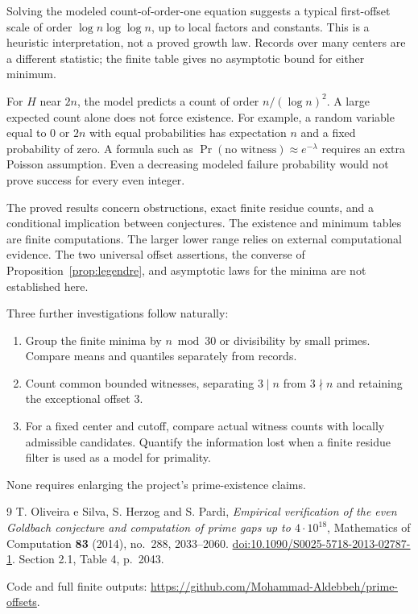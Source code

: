 \documentclass[11pt,a4paper]{article}
\begin{document}
Solving the modeled count-of-order-one equation suggests a typical
first-offset scale of order $\log n\log\log n$, up to local factors and
constants. This is a heuristic interpretation, not a proved growth law.
Records over many centers are a different statistic; the finite table gives
no asymptotic bound for either minimum.

For $H$ near $2n$, the model predicts a count of order $n/(\log n)^2$.
A large expected count alone does not force existence. For example,
a random variable equal to 0 or $2n$ with equal probabilities has
expectation $n$ and a fixed probability of zero. A formula such as
$\Pr(\text{no witness})\approx e^{-\lambda}$ requires an extra Poisson
assumption. Even a decreasing modeled failure probability would not
prove success for every even integer.

The proved results concern obstructions, exact finite residue counts, and
a conditional implication between conjectures. The existence and minimum
tables are finite computations. The larger lower range relies on external
computational evidence. The two universal offset assertions, the converse
of Proposition~\ref{prop:legendre}, and asymptotic laws for the minima are
not established here.

Three further investigations follow naturally:
\begin{enumerate}
\item Group the finite minima by $n\bmod30$ or divisibility by small primes.
Compare means and quantiles separately from records.
\item Count common bounded witnesses, separating $3\mid n$ from
$3\nmid n$ and retaining the exceptional offset 3.
\item For a fixed center and cutoff, compare actual witness counts with
locally admissible candidates. Quantify the information lost when a finite
residue filter is used as a model for primality.
\end{enumerate}
None requires enlarging the project's prime-existence claims.

\begin{thebibliography}{9}
T. Oliveira e Silva, S. Herzog and S. Pardi,
\emph{Empirical verification of the even Goldbach conjecture and computation
of prime gaps up to $4\cdot10^{18}$},
Mathematics of Computation \textbf{83} (2014), no.~288, 2033--2060.
\href{https://doi.org/10.1090/S0025-5718-2013-02787-1}{doi:10.1090/S0025-5718-2013-02787-1}.
Section 2.1, Table 4, p.~2043.
\end{thebibliography}

\small
Code and full finite outputs:
\url{https://github.com/Mohammad-Aldebbeh/prime-offsets}.
\end{document}
